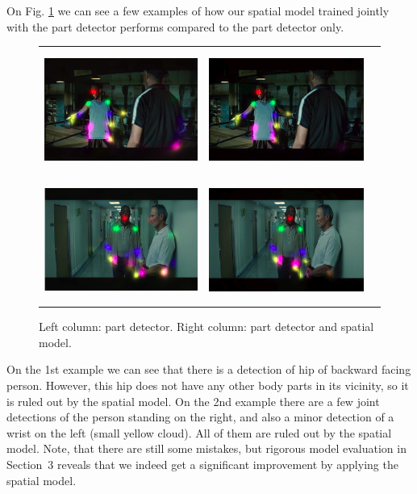 \documentclass[a4paper,10pt]{article}
\begin{document}
	On Fig. \ref{example_pd_vs_sm} we can see a few examples of how our spatial model trained jointly with the part detector performs compared to the part detector only.
	\begin{figure}[H]
		\begin{tabular}{ccc}
			\includegraphics[height=4cm]{img/pd1.png} & \includegraphics[height=4cm]{img/sm1.png} \\
			\includegraphics[height=4cm]{img/pd2.png} & \includegraphics[height=4cm]{img/sm2.png} 
			\caption{Left column: part detector. Right column: part detector and spatial model.}
			\label{example_pd_vs_sm}
		\end{tabular}
	\end{figure}
	On the 1st example we can see that there is a detection of hip of backward facing person. However, this hip does not have any other body parts in its vicinity, so it is ruled out by the spatial model.
	On the 2nd example there are a few joint detections of the person standing on the right, and also a minor detection of a wrist on the left (small yellow cloud). All of them are ruled out by the spatial model. Note, that there are still some mistakes, but rigorous model evaluation in Section~3 reveals that we indeed get a significant improvement by applying the spatial model.
		
\end{document}
